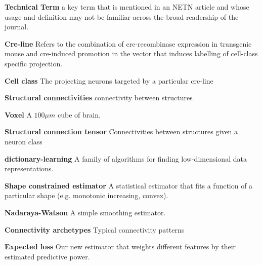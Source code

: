 \documentclass[NETN,manuscript]{stjour-new}
\begin{document}
\textbf{Technical Term} a key term that is mentioned in an NETN article and whose usage and definition may not be familiar across the broad readership of the journal. 

\textbf{Cre-line}  Refers to the combination of cre-recombinase expression in transgenic mouse and cre-induced promotion in the vector that induces labelling of cell-class specific projection. 

\textbf{Cell class} The projecting neurons targeted by a particular cre-line 

\textbf{Structural connectivities}  connectivity between structures 

\textbf{Voxel} A $100 \mu m$ cube of brain. 

\textbf{Structural connection tensor}  Connectivities between structures given a neuron class

\textbf{dictionary-learning} A family of algorithms for finding low-dimensional data representations.

\textbf{Shape constrained estimator} A statistical estimator that fits a function of a particular shape (e.g. monotonic increasing, convex).

\textbf{Nadaraya-Watson} A simple smoothing estimator.

\textbf{Connectivity archetypes} Typical connectivity patterns

 \textbf{Expected loss} Our new estimator that weights different features by their estimated predictive power.
 


\end{document}
